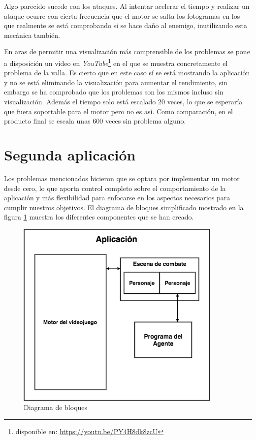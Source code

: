 \bigskip

Algo parecido sucede con los ataques. Al intentar acelerar el tiempo y realizar un ataque ocurre con cierta frecuencia que el motor se salta los fotogramas en los que realmente se está comprobando si se hace daño al enemigo, inutilizando esta mecánica también.

\bigskip

En aras de permitir una visualización más comprensible de los problemas se pone a disposición un vídeo en \textit{YouTube}\footnote{disponible en: \url{https://youtu.be/PY4H8dk8zcU}} en el que se muestra concretamente el problema de la valla. Es cierto que en este caso sí se está mostrando la aplicación y no se está eliminando la visualización para aumentar el rendimiento, sin embargo se ha comprobado que los problemas son los mismos incluso sin visualización. Además el tiempo solo está escalado 20 veces, lo que se esperaría que fuera soportable para el motor pero no es así. Como comparación, en el producto final se escala unas 600 veces sin problema alguno.

\section{Segunda aplicación}

Los problemas mencionados hicieron que se optara por implementar un motor desde cero, lo que aporta control completo sobre el comportamiento de la aplicación y más flexibilidad para enfocarse en los aspectos necesarios para cumplir nuestros objetivos. El diagrama de bloques simplificado mostrado en la figura \ref{bloques} muestra los diferentes componentes que se han creado.

\bigskip

\begin{figure}
	\centerline{\includegraphics[width=10cm]{otros/otrasCapturas/block.png}}
	\caption{Diagrama de bloques}
	\label{bloques}
\end{figure}


